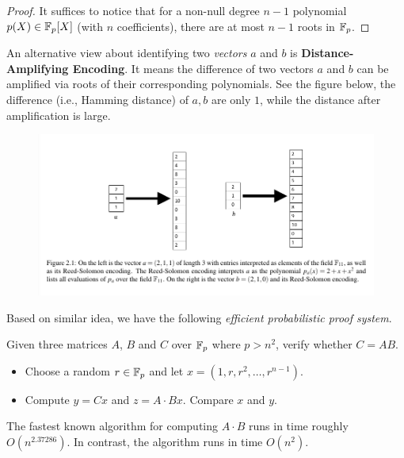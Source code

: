 \documentclass{article}
\begin{document}
\begin{proof}
It suffices to notice that for a non-null degree $n-1$ polynomial $p(X) \in \mathbb{F}_p[X]$ (with $n$ coefficients), there are at most $n-1$ roots in $\mathbb{F}_p$.
\end{proof}

An alternative view about identifying two \textit{vectors} $a$ and $b$ is \textbf{Distance-Amplifying Encoding}. It means the difference of two vectors $a$ and $b$ can be amplified via roots of their corresponding polynomials. See the figure below, the difference (i.e., Hamming distance) of $a, b$ are only $1$, while the distance after amplification is large.  

\begin{figure}[h]
\centering
\includegraphics[scale=0.5]{vector_polynomial} 
\end{figure}


Based on similar idea, we have the following \textit{efficient probabilistic proof system}.

\begin{boxx1} \label{def:feivalds}

Given three matrices $A$, $B$ and $C$ over $\mathbb{F}_p$ where $p > n^2$, verify whether $C = AB$. 

\begin{itemize}
\item Choose a random $r \in \mathbb{F}_p$ and let $x = (1, r, r^2, \dots, r^{n-1})$. 
\item Compute $y = Cx$ and $z = A \cdot Bx$. Compare $x$ and $y$. 
\end{itemize}

\end{boxx1}

\begin{remark}
The fastest known algorithm for computing $A \cdot B$ runs in time roughly $O(n^{2.37286})$. In contrast, the algorithm runs in time $O(n^2)$. 
\end{remark}
\end{document}
